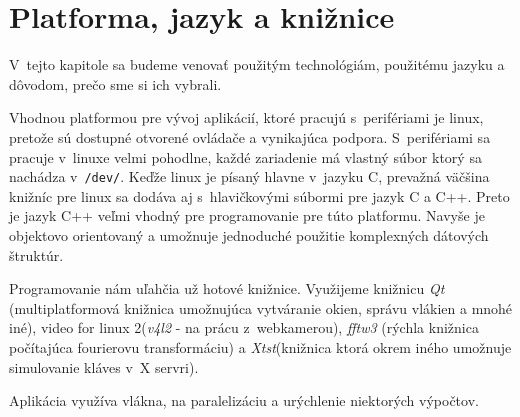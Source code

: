 \chapter{Platforma, jazyk a knižnice}

V~tejto kapitole sa budeme venovať použitým technológiám, použitému jazyku a dôvodom, prečo sme si ich vybrali.
\bigskip

Vhodnou platformou pre vývoj aplikácií, ktoré pracujú s~perifériami je linux, pretože sú dostupné otvorené ovládače a vynikajúca podpora. S~perifériami sa pracuje v~linuxe velmi pohodlne, každé zariadenie má vlastný súbor ktorý sa nachádza v~{\tt /dev/}.
Keďže linux je písaný hlavne v~jazyku C, prevažná väčšina knižníc pre linux sa dodáva aj s~hlavičkovými súbormi pre jazyk C a C++.
Preto je jazyk C++ veľmi vhodný pre programovanie pre túto platformu. Navyše je objektovo orientovaný a umožnuje jednoduché použitie komplexných dátových štruktúr.

Programovanie nám uľahčia už hotové knižnice. Využijeme knižnicu \textit{Qt} (multiplatformová knižnica umožnujúca vytváranie okien, správu vlákien a mnohé iné),
video for linux 2(\textit{v4l2} - na prácu z~webkamerou), \textit{fftw3} (rýchla knižnica počítajúca fourierovu transformáciu) a \textit{Xtst}(knižnica ktorá okrem iného umožnuje simulovanie kláves v~X servri).

Aplikácia využíva vlákna, na paralelizáciu a urýchlenie niektorých výpočtov.
